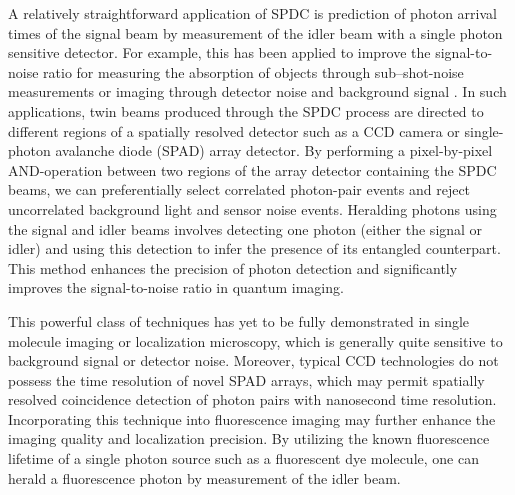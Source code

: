 A relatively straightforward application of SPDC is prediction of photon arrival times of the signal beam by measurement of the idler beam with a single photon sensitive detector. For example, this has been applied to improve the signal-to-noise ratio for measuring the absorption of objects through sub–shot-noise measurements \parencite{Brida2010} or imaging through detector noise and background signal \parencite{Gregory2020,Wolley2022}. In such applications, twin beams produced through the SPDC process are directed to different regions of a spatially resolved detector such as a CCD camera or single-photon avalanche diode (SPAD) array detector. By performing a pixel-by-pixel AND-operation between two regions of the array detector containing the SPDC beams, we can preferentially select correlated photon-pair events and reject uncorrelated background light and sensor noise events. Heralding photons using the signal and idler beams involves detecting one photon (either the signal or idler) and using this detection to infer the presence of its entangled counterpart. This method enhances the precision of photon detection and significantly improves the signal-to-noise ratio in quantum imaging.

This powerful class of techniques has yet to be fully demonstrated in single molecule imaging or localization microscopy, which is generally quite sensitive to background signal or detector noise. Moreover, typical CCD	 technologies do not possess the time resolution of novel SPAD arrays, which may permit spatially resolved coincidence detection of photon pairs with nanosecond time resolution. Incorporating this technique into fluorescence imaging may further enhance the imaging quality and localization precision. By utilizing the known fluorescence lifetime of a single photon source such as a fluorescent dye molecule, one can herald a fluorescence photon by measurement of the idler beam.

